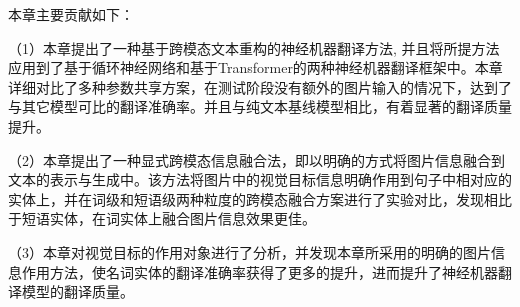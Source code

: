 本章主要贡献如下：

（1）本章提出了一种基于跨模态文本重构的神经机器翻译方法, 并且将所提方法应用到了基于循环神经网络和基于Transformer的两种神经机器翻译框架中。本章详细对比了多种参数共享方案，在测试阶段没有额外的图片输入的情况下，达到了与其它模型可比的翻译准确率。并且与纯文本基线模型相比，有着显著的翻译质量提升。

（2）本章提出了一种显式跨模态信息融合法，即以明确的方式将图片信息融合到文本的表示与生成中。该方法将图片中的视觉目标信息明确作用到句子中相对应的实体上，并在词级和短语级两种粒度的跨模态融合方案进行了实验对比，发现相比于短语实体，在词实体上融合图片信息效果更佳。

（3）本章对视觉目标的作用对象进行了分析，并发现本章所采用的明确的图片信息作用方法，使名词实体的翻译准确率获得了更多的提升，进而提升了神经机器翻译模型的翻译质量。
